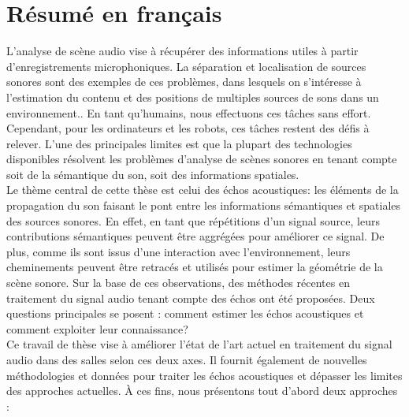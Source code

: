 \chapter*{Résumé en français}


    L'analyse
     de scène audio vise à récupérer des informations utiles à partir d'enregistrements microphoniques.
    La séparation et localisation de sources sonores sont des exemples de ces problèmes, dans lesquels on s'intéresse à l'estimation du contenu et des positions de multiples sources de sons dans un environnement..
    En tant qu'humains, nous effectuons ces tâches sans effort.
    Cependant, pour les ordinateurs et les robots, ces tâches restent des défis à relever.
    L'une des principales limites est que la plupart des technologies disponibles résolvent les problèmes d'analyse de scènes sonores en tenant compte soit de la sémantique du son, soit des informations spatiales.
    \\Le thème central de cette thèse est celui des échos acoustiques: les éléments de la propagation du son faisant le pont entre les informations sémantiques et spatiales des sources sonores.
    En effet, en tant que répétitions d'un signal source, leurs contributions sémantiques peuvent être aggrégées pour améliorer ce signal.
    De plus, comme ils sont issus d'une interaction avec l'environnement, leurs cheminements peuvent être retracés et utilisés pour estimer la géométrie de la scène sonore.
    Sur la base de ces observations, des méthodes récentes en traitement du signal audio tenant compte des échos ont été proposées.
    Deux questions principales se posent : comment estimer les échos acoustiques et comment exploiter leur connaissance?
    \\Ce travail de thèse vise à améliorer l'état de l'art actuel en traitement du signal audio dans des salles selon ces deux axes.
    Il fournit également de nouvelles méthodologies et données pour traiter les échos acoustiques et dépasser les limites des approches actuelles.
    À ces fins, nous présentons tout d'abord deux approches :
